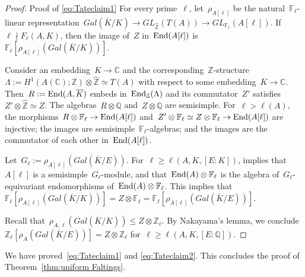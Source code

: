 \documentclass[12pt]{amsart}
\newcommand{\End}{{\rm End}}
\newcommand{\F}{{\mathbb F}}
\newcommand{\Z}{{\mathbb Z}}
\newcommand{\Q}{{\mathbb Q}}
\newcommand{\C}{{\mathbb C}}
\newcommand{\ol}{\overline}
\newcommand{\wh}{\widehat}
\newcommand{\tens}{\otimes}
\begin{document}
\begin{proof}{Proof of \eqref{eq:Tateclaim1}}
For every prime~$\ell$, let~$\rho_{A[\ell]}$ be the natural~$\F_\ell$-linear representation~$Gal(\ol{K}/K)\to GL_{\wh{\Z}}(T(A))\to GL_{\F_\ell}(A[\ell])$.
If~$\ell \nmid F_\ell(A,K)$, then the image of~$Z$ in~$\End(A[\ell])$ is~$\F_\ell[\rho_{A[\ell]}(Gal(\ol{K}/K))]$.

Consider an embedding~$K\to \C$ and the corresponding~$\Z$-structure~$\Lambda:=H^1(A(\C);\Z)\tens\wh{\Z}\simeq T(A)$ with respect to some embedding~$\ol{K}\to \C$. Then~$R:=\End(A,\ol{K})$ embeds in~$\End_\Z(\Lambda)$ and its commutator~$Z'$ satisfies~$Z'\tens \wh{\Z}\simeq Z$. The algebras~$R\tens\Q$ and~$Z\tens\Q$ are semisimple. For~$\ell>\ell(A)$, the morphisms~$R\tens \F_\ell\to \End(A[\ell])$ and~$Z'\tens\F_\ell\simeq Z\tens\F_\ell\to\End(A[\ell])$ are injective; the images are semisimple~$\F_\ell$-algebras; and the images are the commutator of each other in~$\End(A[\ell])$.

Let~$G_\ell:=\rho_{A[\ell]}(Gal(\ol{K}/E))$.
For~$\ell\geq \ell(A,K,[E:K])$, \cite[Def. 2.1]{RY:IHES} implies that~$A[\ell]$ is a semisimple~$G_\ell$-module, and that~$\End(A)\tens\F_\ell$ is the algebra of~$G_\ell$-equivariant endomorphisms of~$\End(A)\tens\F_\ell$. This implies that~$\F_\ell[\rho_{A[\ell]}(Gal(\ol{K}/K))]=Z\tens\F_\ell=\F_\ell[\rho_{A[\ell]}(Gal(\ol{K}/E))]$. 

Recall that~$\rho_{A,\ell}(Gal(\ol{K}/K))\leq Z\tens\Z_\ell$. By Nakayama's lemma, we conclude~$\Z_\ell[\rho_A(Gal(\ol{K}/E))]=Z\tens\Z_\ell$ for~$\ell\geq \ell(A,K,[E:\Q])$.
\end{proof}
We have proved~\eqref{eq:Tateclaim1} and \eqref{eq:Tateclaim2}.
This concludes the proof of Theorem~\ref{thm:uniform Faltings}.
%
%
\end{document}
